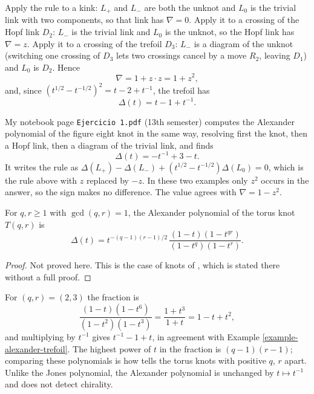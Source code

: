 \begin{example}
\label{example-alexander-trefoil}
Apply the rule to a kink: $L_{+}$ and
$L_{-}$ are both the unknot and $L_{0}$
is the trivial link with two
components, so that link has
$\nabla=0$. Apply it to a crossing of
the Hopf link $D_2$: $L_{-}$ is the
trivial link and $L_{0}$ is the unknot,
so the Hopf link has $\nabla=z$. Apply
it to a crossing of the trefoil $D_3$:
$L_{-}$ is a diagram of the unknot
(switching one crossing of $D_3$ lets
two crossings cancel by a move $R_2$,
leaving $D_1$) and $L_{0}$ is $D_2$.
Hence
$$
\nabla=1+z\cdot z=1+z^{2},
$$
and, since
$(t^{1/2}-t^{-1/2})^{2}=t-2+t^{-1}$,
the trefoil has
$$
\Delta(t)=t-1+t^{-1}.
$$
\end{example}

\begin{example}
\label{example-alexander-figure-eight}
My notebook page
{\tt Ejercicio 1.pdf} (13th semester)
computes the Alexander polynomial of
the figure eight knot in the same way,
resolving first the knot, then a Hopf
link, then a diagram of the trivial
link, and finds
$$
\Delta(t)=-t^{-1}+3-t.
$$
It writes the rule as
$\Delta(L_{+})-\Delta(L_{-})
+(t^{1/2}-t^{-1/2})\Delta(L_{0})=0$,
which is the rule above with $z$
replaced by $-z$. In these two examples
only $z^{2}$ occurs in the answer, so
the sign makes no difference. The value
agrees with $\nabla=1-z^{2}$.
\end{example}

\begin{theorem}
\label{theorem-alexander-torus}
For $q,r\geq 1$ with $\gcd(q,r)=1$,
the Alexander polynomial of the torus
knot $T(q,r)$ is
$$
\Delta(t)=
t^{-(q-1)(r-1)/2}\,
\frac{(1-t)(1-t^{qr})}
{(1-t^{q})(1-t^{r})}.
$$
\end{theorem}

\begin{proof}
Not proved here. This is the case of
knots of
\cite[Theorem 7.3.2]{murasugi}, which
is stated there without a full proof.
\end{proof}

\noindent
For $(q,r)=(2,3)$ the fraction is
$$
\frac{(1-t)(1-t^{6})}
{(1-t^{2})(1-t^{3})}
=\frac{1+t^{3}}{1+t}
=1-t+t^{2},
$$
and multiplying by $t^{-1}$ gives
$t^{-1}-1+t$, in agreement with
Example \ref{example-alexander-trefoil}.
The highest power of $t$ in the
fraction is $(q-1)(r-1)$; comparing
these polynomials is how
\cite[Theorem 7.4.1]{murasugi} tells
the torus knots with positive $q$, $r$
apart. Unlike the Jones polynomial, the
Alexander polynomial is unchanged by
$t\mapsto t^{-1}$ and does not detect
chirality.

